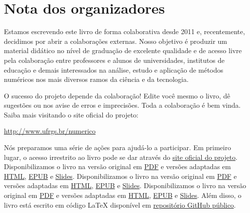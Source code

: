
\chapter*{Nota dos organizadores}

Estamos escrevendo este livro de forma colaborativa desde 2011 e, recentemente, decidimos por abrir a colaborações externas. Nosso objetivo é produzir um material didático no nível de graduação de excelente qualidade e de acesso livre pela colaboração entre professores e alunos de universidades, institutos de educação e demais interessados na análise, estudo e aplicação de métodos numéricos nos mais diversos ramos da ciência e da tecnologia.

O sucesso do projeto depende da colaboração! Edite você mesmo o livro, dê sugestões ou nos avise de erros e imprecisões. Toda a colaboração é bem vinda. Saiba mais visitando o site oficial do projeto:
\begin{center}
  \url{http://www.ufrgs.br/numerico}
\end{center}

Nós preparamos uma série de ações para ajudá-lo a participar. Em primeiro lugar, o acesso irrestrito ao livro pode se dar através do \href{http://www.ufrgs.br/numerico}{site oficial do projeto}. 
\ifisscilab
Disponibilizamos o livro na versão original em \href{https://www.ufrgs.br/numerico/livro/main.pdf}{PDF} e versões adaptadas em \href{https://www.ufrgs.br/numerico/livro/main.html}{HTML}, \href{https://www.ufrgs.br/numerico/livro/main.epub}{EPUB} e \href{https://www.ufrgs.br/numerico/livro/slide.pdf}{Slides}.
\fi
\ifisoctave
Disponibilizamos o livro na versão original em \href{https://www.ufrgs.br/numerico/livro-oct/main-oct.pdf}{PDF} e versões adaptadas em \href{https://www.ufrgs.br/numerico/livro-oct/main.html}{HTML}, \href{https://www.ufrgs.br/numerico/livro-oct/main-oct.epub}{EPUB} e \href{https://www.ufrgs.br/numerico/livro-oct/slide-oct.pdf}{Slides}.
\fi
\ifispython
Disponibilizamos o livro na versão original em \href{https://www.ufrgs.br/numerico/livro-py/main-py.pdf}{PDF} e versões adaptadas em \href{https://www.ufrgs.br/numerico/livro-py/main.html}{HTML}, \href{https://www.ufrgs.br/numerico/livro-py/main-py.epub}{EPUB} e \href{https://www.ufrgs.br/numerico/livro-py/slide-py.pdf}{Slides}.
\fi
Além disso, o livro está escrito em código \LaTeX{} disponível em \href{https://github.com/livroscolaborativos/CalculoNumerico}{repositório GitHub público}. 

